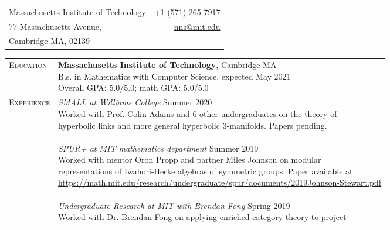 \documentclass[a4paper,10pt]{article} %
\begin{document}
\pagestyle{empty} %



\hrulefill

\vspace{10pt}
\begin{tabularx}{\textwidth}{X r}
  Massachusetts Institute of Technology \hspace{175pt}
& +1 (571) 265-7917\\
77 Massachusetts Avenue,
& \href{mailto:nns@mit.edu}{nns@mit.edu}\\
Cambridge MA, 02139
\end{tabularx}


\setlength{\tabcolsep}{12pt}
\renewcommand{\arraystretch}{3}

\begin{tabularx}{\textwidth}{l X}
  \textsc{\small Education}
  & \Longunderstack{\textbf{Massachusetts Institute of Technology}, Cambridge MA\\
    B.s. in Mathematics with Computer Science, expected May 2021\\
    Overall GPA: 5.0/5.0; math GPA: 5.0/5.0}\\
  \textsc{\small Experience}
  & \Longunderstack{\textit{SMALL at Williams College} \hspace{171pt} Summer 2020\\
    Worked with Prof. Colin Adams and 6 other undergraduates on the theory of \\
    hyperbolic links and more general hyperbolic 3-manifolds.
    Papers pending.\\ \\     
  \textit{SPUR+ at MIT mathematics department} \hspace{114pt} Summer 2019\\
    Worked with mentor Oron Propp and partner Miles Johnson on modular\\
    representations of Iwahori-Hecke algebras of symmetric groups. Paper available at\\ \href{https://math.mit.edu/research/undergraduate/spur/documents/2019Johnson-Stewart.pdf}{https://math.mit.edu/research/undergraduate/spur/documents/2019Johnson-Stewart.pdf}\\ \\ 
  \textit{Undergraduate Research at MIT with Brendan Fong} \hspace{75pt} Spring 2019\\
    Worked with Dr. Brendan Fong on applying enriched category theory to project\\
}
\end{tabularx}
\end{document}
